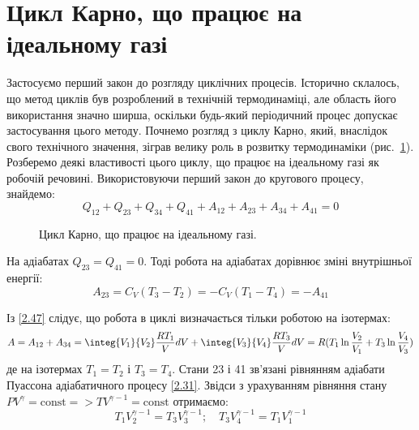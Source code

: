 \section{Цикл Карно, що працює на ідеальному газі}

Застосуємо перший закон до розгляду циклічних процесів. Історично склалось, що метод циклів
був розроблений в технічній термодинаміці, але область його використання значно ширша,
оскільки будь-який періодичний процес допускає застосування цього методу. Почнемо розгляд з
циклу Карно, який, внаслідок свого технічного значення, зіграв велику роль в розвитку
термодинаміки (рис.~\ref{tikz:Carnot}). Розберемо деякі властивості цього циклу, що працює на
ідеальному газі як робочій речовині. Використовуючи перший закон до кругового процесу,
знайдемо:
\begin{equation}\label{2.46}
	Q_{12} + Q_{23} + Q_{34} + Q_{41} + A_{12} + A_{23} + A_{34} + A_{41} =0
\end{equation}

\begin{figure}[h!]\centering
	
	\caption{Цикл Карно, що працює на ідеальному газі.}
	\label{tikz:Carnot}
\end{figure}

На адіабатах $Q_{23} = Q_{41} =0$. Тоді робота на адіабатах дорівнює зміні внутрішньої енергії:
\begin{equation}\label{2.47}
	A_{23} = C_V(T_3-T_2) = -C_V(T_1-T_4)=-A_{41}
\end{equation}

Із \eqref{2.47} слідує, що робота в циклі визначається тільки роботою на ізотермах:
\begin{equation}\label{2.48}
	A = A_{12} + A_{34} = \integ{V_1}{V_2}\dfrac{RT_1}{V}dV + \integ{V_3}{V_4} \dfrac{RT_3}{V}dV =
R(T_1\ln\dfrac{V_2}{V_1} + T_3\ln\dfrac{V_4}{V_3})
\end{equation}
де на ізотермах $T_1 = T_2$ і $T_3 = T_4$. Стани 23 і 41 зв'язані рівнянням адіабати Пуассона
адіабатичного процесу \eqref{2.31}. Звідси з урахуванням рівняння стану $PV^{\gamma} =
	\text{const} => TV^{\gamma-1} = \mathrm{const}$ отримаємо:
\begin{equation}\label{2.49}
	T_{1}V_{2}^{\gamma-1} = T_{3}V_{3}^{\gamma-1}; \quad T_{3}V_{4}^{\gamma-1} = T_{1}V_{1}^{\gamma-1}
\end{equation}

